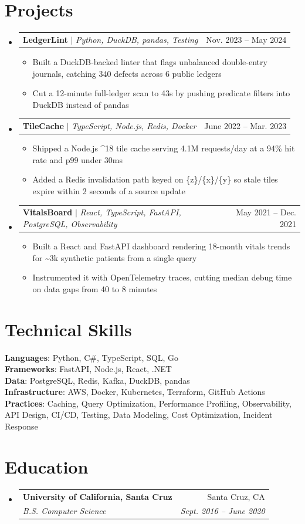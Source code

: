 \documentclass[letterpaper,11pt]{article}
\makeatletter
\newcommand{\resumeItem}[1]{
  \item\small{
    {#1 \vspace{-2pt}}
  }
}
\newcommand{\resumeSubheading}[4]{
  \vspace{-2pt}\item
    \begin{tabular*}{0.97\textwidth}[t]{l@{\extracolsep{\fill}}r}
      \textbf{#1} & #2 \\
      \textit{\small#3} & \textit{\small #4} \\
    \end{tabular*}\vspace{-7pt}
}
\newcommand{\resumeWrappingHeading}[2]{
    \item
    \begin{tabularx}{0.97\textwidth}{@{}X@{\extracolsep{\fill}}r@{}}
      \small#1 & #2 \\
    \end{tabularx}\vspace{-7pt}
}
\newcommand{\resumeSubHeadingListStart}{\begin{itemize}[leftmargin=0.15in, label={}]}
\newcommand{\resumeSubHeadingListEnd}{\end{itemize}}
\newcommand{\resumeItemListStart}{\begin{itemize}}
\newcommand{\resumeItemListEnd}{\end{itemize}\vspace{-5pt}}
\makeatother
\begin{document}
\section{Projects}
    \resumeSubHeadingListStart
      \resumeWrappingHeading
          {\textbf{LedgerLint} $|$ \emph{Python, DuckDB, pandas, Testing}}{Nov. 2023 -- May 2024}
          \resumeItemListStart
            \resumeItem{Built a DuckDB-backed linter that flags unbalanced double-entry journals, catching 340 defects across 6 public ledgers}
            \resumeItem{Cut a 12-minute full-ledger scan to 43s by pushing predicate filters into DuckDB instead of pandas}
          \resumeItemListEnd
      \resumeWrappingHeading
          {\textbf{TileCache} $|$ \emph{TypeScript, Node.js, Redis, Docker}}{June 2022 -- Mar. 2023}
          \resumeItemListStart
            \resumeItem{Shipped a Node.js \textasciicircum{}18 tile cache serving 4.1M requests/day at a 94\% hit rate and p99 under 30ms}
            \resumeItem{Added a Redis invalidation path keyed on \{z\}/\{x\}/\{y\} so stale tiles expire within 2 seconds of a source update}
          \resumeItemListEnd
      \resumeWrappingHeading
          {\textbf{VitalsBoard} $|$ \emph{React, TypeScript, FastAPI, PostgreSQL, Observability}}{May 2021 -- Dec. 2021}
          \resumeItemListStart
            \resumeItem{Built a React and FastAPI dashboard rendering 18-month vitals trends for \textasciitilde{}3k synthetic patients from a single query}
            \resumeItem{Instrumented it with OpenTelemetry traces, cutting median debug time on data gaps from 40 to 8 minutes}
          \resumeItemListEnd
    \resumeSubHeadingListEnd
\section{Technical Skills}
 \begin{itemize}[leftmargin=0.15in, label={}]
    \small{\item{
     \textbf{Languages}{: Python, C\#, TypeScript, SQL, Go} \\
     \textbf{Frameworks}{: FastAPI, Node.js, React, .NET} \\
     \textbf{Data}{: PostgreSQL, Redis, Kafka, DuckDB, pandas} \\
     \textbf{Infrastructure}{: AWS, Docker, Kubernetes, Terraform, GitHub Actions} \\
     \textbf{Practices}{: Caching, Query Optimization, Performance Profiling, Observability, API Design, CI/CD, Testing, Data Modeling, Cost Optimization, Incident Response}
    }}
 \end{itemize}
\section{Education}
  \resumeSubHeadingListStart
    \resumeSubheading
      {University of California, Santa Cruz}{Santa Cruz, CA}
      {B.S. Computer Science}{Sept. 2016 -- June 2020}
  \resumeSubHeadingListEnd

\end{document}
